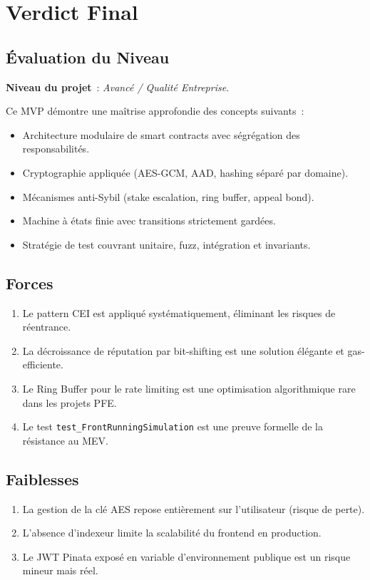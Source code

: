 \documentclass[12pt, a4paper]{report}
\begin{document}
\chapter{Verdict Final}

\section{\'{E}valuation du Niveau}
\textbf{Niveau du projet}~: \textit{Avanc\'{e} / Qualit\'{e} Entreprise}.

Ce MVP d\'{e}montre une ma\^{i}trise approfondie des concepts suivants~:
\begin{itemize}
    \item Architecture modulaire de smart contracts avec s\'{e}gr\'{e}gation des responsabilit\'{e}s.
    \item Cryptographie appliqu\'{e}e (AES-GCM, AAD, hashing s\'{e}par\'{e} par domaine).
    \item M\'{e}canismes anti-Sybil (stake escalation, ring buffer, appeal bond).
    \item Machine \`{a} \'{e}tats finie avec transitions strictement gard\'{e}es.
    \item Strat\'{e}gie de test couvrant unitaire, fuzz, int\'{e}gration et invariants.
\end{itemize}

\section{Forces}
\begin{enumerate}
    \item Le pattern CEI est appliqu\'{e} syst\'{e}matiquement, \'{e}liminant les risques de r\'{e}entrance.
    \item La d\'{e}croissance de r\'{e}putation par bit-shifting est une solution \'{e}l\'{e}gante et gas-efficiente.
    \item Le Ring Buffer pour le rate limiting est une optimisation algorithmique rare dans les projets PFE.
    \item Le test \texttt{test\_FrontRunningSimulation} est une preuve formelle de la r\'{e}sistance au MEV.
\end{enumerate}

\section{Faiblesses}
\begin{enumerate}
    \item La gestion de la cl\'{e} AES repose enti\`{e}rement sur l'utilisateur (risque de perte).
    \item L'absence d'indexeur limite la scalabilit\'{e} du frontend en production.
    \item Le JWT Pinata expos\'{e} en variable d'environnement publique est un risque mineur mais r\'{e}el.
\end{enumerate}
\end{document}
